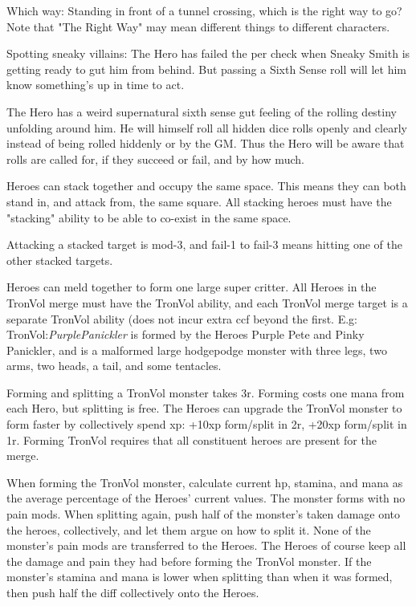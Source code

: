 Which way: Standing in front of a tunnel crossing, which is the right way to go? Note that "The Right Way" may mean different things to different characters.

Spotting sneaky villains: The Hero has failed the per check when Sneaky Smith is getting ready to gut him from behind. But passing a Sixth Sense roll will let him know something's up in time to act.


 The Hero has a weird supernatural sixth sense gut feeling of the rolling destiny unfolding around him. He will himself roll all hidden dice rolls openly and clearly instead of being rolled hiddenly or by the GM. Thus the Hero will be aware that rolls are called for, if they succeed or fail, and by how much.


 Heroes can stack together and occupy the same space. This means they can both stand in, and attack from, the same square. All stacking heroes must have the "stacking" ability to be able to co-exist in the same space.

Attacking a stacked target is mod-3, and fail-1 to fail-3 means hitting one of the other stacked targets.




 Heroes can meld together to form one large super critter. All Heroes in the TronVol merge must have the TronVol ability, and each TronVol merge target is a separate TronVol ability (does not incur extra ccf beyond the first.
E.g: TronVol:\emph{PurplePanickler} is formed by the Heroes Purple Pete and Pinky Panickler, and is a malformed large hodgepodge monster with three legs, two arms, two heads, a tail, and some tentacles.

Forming and splitting a TronVol monster takes 3r. Forming costs one mana from each Hero, but splitting is free. The Heroes can upgrade the TronVol monster to form faster by collectively spend xp: +10xp form/split in 2r, +20xp form/split in 1r.
Forming TronVol requires that all constituent heroes are present for the merge.

When forming the TronVol monster, calculate current hp, stamina, and mana as the average percentage of the Heroes' current values. The monster forms with no pain mods. When splitting again, push half of the monster's taken damage onto the heroes, collectively, and let them argue on how to split it. None of the monster's pain mods are transferred to the Heroes. The Heroes of course keep all the damage and pain they had before forming the TronVol monster. If the monster's stamina and mana is lower when splitting than when it was formed, then push half the diff collectively onto the Heroes.

